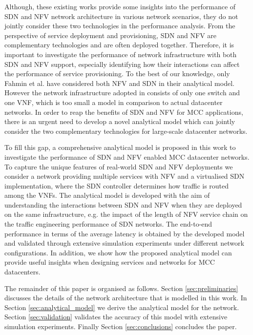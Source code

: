 Although, these existing works provide some insights into the performance of SDN and NFV network architecture in various network scenarios, they do not jointly consider these two technologies in the performance analysis. From the perspective of service deployment and provisioning, SDN and NFV are complementary technologies and are often deployed together. Therefore, it is important to investigate the performance of network infrastructure with both SDN and NFV support, especially identifying how their interactions can affect the performance of service provisioning. To the best of our knowledge, only Fahmin et al. \cite{FahminLHLS17} have considered both NFV and SDN in their analytical model. However the network infrastructure adopted in \cite{FahminLHLS17} consists of only one switch and one VNF, which is too small a model in comparison to actual datacenter networks. In order to reap the benefits of SDN and NFV for MCC applications, there is an urgent need to develop a novel analytical model which can jointly consider the two complementary technologies for large-scale datacenter networks.
 
To fill this gap, a comprehensive analytical model is proposed in this work to investigate the performance of SDN and NFV enabled MCC datacenter networks. To capture the unique features of real-world SDN and NFV deployments we consider a network providing multiple services with NFV and a virtualised SDN implementation, where the SDN controller determines how traffic is routed among the VNFs. The analytical model is developed with the aim of understanding the interactions between SDN and NFV when they are deployed on the same infrastructure, e.g. the impact of the length of NFV service chain on the traffic engineering performance of SDN networks. The end-to-end performance in terms of the average latency is obtained by the developed model and validated through extensive simulation experiments under different network configurations. In addition, we show how the proposed analytical model can provide useful insights when designing services and networks for MCC datacenters.

The remainder of this paper is organised as follows. Section \ref{sec:preliminaries} discusses the details of the network architecture that is modelled in this work. In Section \ref{sec:analytical_model} we derive the analytical model for the network. Section \ref{sec:validation} validates the accuracy of this model with extensive simulation experiments. Finally Section \ref{sec:conclusions} concludes the paper.